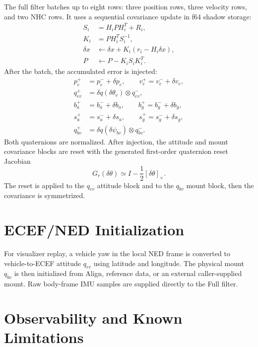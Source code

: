 \documentclass[11pt]{article}
\newcommand{\T}{^{T}}
\newcommand{\crossmat}[1]{\left[#1\right]_\times}
\newcommand{\dq}{\delta q}
\begin{document}
The full filter batches up to eight rows: three position rows, three velocity
rows, and two NHC rows. It uses a sequential covariance update in f64 shadow
storage:
\begin{align}
  S_i &= H_iPH_i\T+R_i,\\
  K_i &= PH_i\T S_i^{-1},\\
  \delta x &\leftarrow \delta x + K_i(r_i-H_i\delta x),\\
  P &\leftarrow P-K_iS_iK_i\T .
\end{align}
After the batch, the accumulated error is injected:
\begin{align}
  p_e^{+}&=p_e^{-}+\delta p_e,\qquad
  v_e^{+}=v_e^{-}+\delta v_e,\\
  q_{ev}^{+}&=\dq(\delta\theta_v)\otimes q_{ev}^{-},\\
  b_a^{+}&=b_a^{-}+\delta b_a,\qquad
  b_g^{+}=b_g^{-}+\delta b_g,\\
  s_a^{+}&=s_a^{-}+\delta s_a,\qquad
  s_g^{+}=s_g^{-}+\delta s_g,\\
  q_{bv}^{+}&=\dq(\delta\psi_{bv})\otimes q_{bv}^{-}.
\end{align}
Both quaternions are normalized. After injection, the attitude and mount
covariance blocks are reset with the generated first-order quaternion
reset Jacobian
\begin{equation}
  G_r(\delta\theta)\simeq I-\frac{1}{2}\crossmat{\delta\theta}.
\end{equation}
The reset is applied to the \(q_{ev}\) attitude block and to the \(q_{bv}\)
mount block, then the covariance is symmetrized.

\section{ECEF/NED Initialization}

For visualizer replay, a vehicle yaw in the local NED frame is converted to
vehicle-to-ECEF attitude \(q_{ev}\) using latitude and longitude. The physical
mount \(q_{bv}\) is then initialized from Align, reference data, or an external
caller-supplied mount. Raw body-frame IMU samples are supplied directly to the
Full filter.

\section{Observability and Known Limitations}
\end{document}
